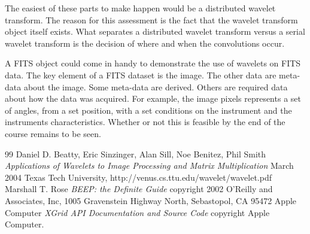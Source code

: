 \documentclass[11pt]{article}
\begin{document}
The easiest of these parts to make happen would be a distributed wavelet transform.  The reason for this assessment is the fact that the wavelet transform object itself exists.  What separates a distributed wavelet transform versus a serial wavelet transform is the decision of where and when the convolutions occur.  

A FITS object could come in handy to demonstrate the use of wavelets on FITS data.  The key element of a FITS dataset is the image.  The other data are meta-data about the image.  Some meta-data are derived.  Others are required data about how the data was acquired.  For example, the image pixels represents a set of angles, from a set position, with a set conditions on the instrument and the instruments characteristics.  Whether or not this is feasible by the end of the course remains to be seen.  




\begin{thebibliography} {99}
 Daniel D. Beatty, Eric Sinzinger, Alan Sill, Noe Benitez, Phil Smith \textsl{Applications of Wavelets to Image Processing and Matrix Multiplication}  March 2004 Texas Tech University, http://venus.cs.ttu.edu/wavelet/wavelet.pdf  
 Marshall T. Rose \textsl{BEEP: the Definite Guide} copyright 2002 O'Reilly and Associates, Inc, 1005 Gravenstein Highway North, Sebastopol, CA 95472
 Apple Computer \textsl{XGrid API Documentation and Source Code} copyright Apple Computer.
\end{thebibliography}




 
\end{document}
